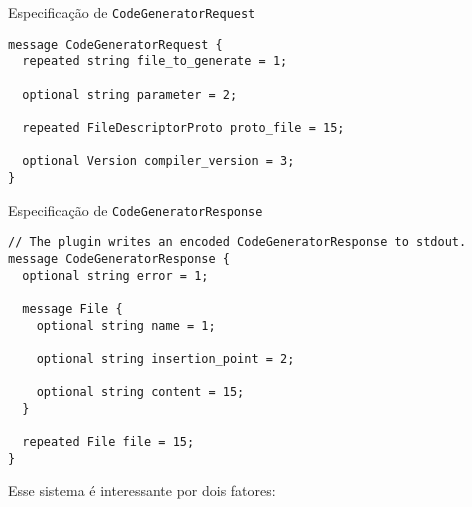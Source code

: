 \begin{listing}[ht]
\caption{Especificação de \texttt{CodeGeneratorRequest}}
\label{lst:code-gen-req}
\begin{verbatim}
message CodeGeneratorRequest {
  repeated string file_to_generate = 1;

  optional string parameter = 2;

  repeated FileDescriptorProto proto_file = 15;

  optional Version compiler_version = 3;
}
\end{verbatim}
\end{listing}

\begin{listing}[ht]
\caption{Especificação de \texttt{CodeGeneratorResponse}}
\label{lst:code-gen-res}
\begin{verbatim}
// The plugin writes an encoded CodeGeneratorResponse to stdout.
message CodeGeneratorResponse {
  optional string error = 1;

  message File {
    optional string name = 1;

    optional string insertion_point = 2;

    optional string content = 15;
  }

  repeated File file = 15;
}
\end{verbatim}
\end{listing}

Esse sistema é interessante por dois fatores:


